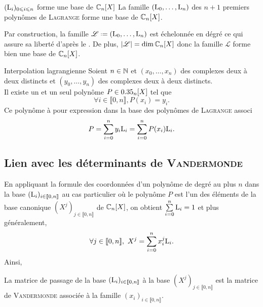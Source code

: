 \begin{prop}{$(\mathrm{L}_i)_{0 \leqslant i \leqslant n}$ forme une base de $\mathbb{C}_n[X]$}
    La famille $(\mathrm{L}_0, \dots, \mathrm{L}_n)$ des $n+1$ premiers polynômes de \textsc{Lagrange} forme une base de $\mathbb{C}_n[X]$.
\end{prop}

\begin{preuve} 
    Par construction, la famille $\mathscr{L} \defeq (\Lag_0, \dots, \Lag_n)$ est échelonnée en dégré ce qui assure sa liberté d'après le . De plus, $|\mathscr{L}| = \dim \mathbb{C}_n[X]$ donc la famille $\mathscr{L}$ forme bien une base de $\mathbb{C}_n[X]$.
\end{preuve}

\begin{theo}{Interpolation lagrangienne}
Soient $n \in \mathbb{N}$ et $(x_0, \dots, x_n)$ des complexes deux à deux distincts et $(y_0, \dots, y_n)$ des complexes deux à deux distincts. \\
Il existe un et un seul polynôme $P \in 0.35_n[X]$ tel que 
$$\forall i \in \llbracket 0, n \rrbracket, P(x_i) = y_i.$$ 
Ce polynôme à pour expression dans la base des polynômes de \textsc{Lagrange} associ
$$P = \sum_{i=0}^n y_i \mathrm{L}_i = \sum_{i=0}^n P(x_i) \mathrm{L}_i.$$
\end{theo}

\subsection{Lien avec les déterminants de \textsc{Vandermonde}}

En appliquant la formule des coordonnées d'un polynôme de degré au plus $n$ dans la base $(\mathrm{L}_i)_{i \in \llbracket 0, n \rrbracket}$ au cas particulier où le polynôme $P$ est l'un des éléments de la base canonique $(X^j)_{j \in \llbracket 0, n \rrbracket}$ de $\mathbb{C}_n[X]$, on obtient $\sum\limits_{i=0}^{n} \mathrm{L}_i = 1$ et plus généralement, 
$$\forall j \in \llbracket 0, n \rrbracket,\ X^j = \sum_{i=0}^{n} x_i ^j \mathrm{L}_i.$$
Ainsi, 
\begin{prop}{}
    La matrice de passage de la base  $(\mathrm{L}_i)_{i \in \llbracket 0, n \rrbracket}$ à la base  $(X^j)_{j \in \llbracket 0, n \rrbracket}$ est la matrice de \textsc{Vandermonde} associée à la famille $(x_i)_{i \in \llbracket 0, n \rrbracket}$.
\end{prop}

